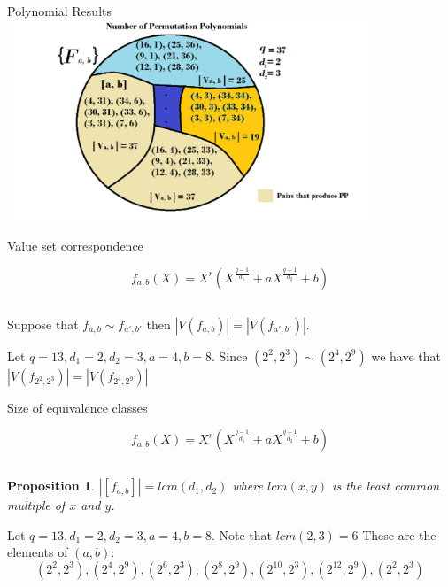 \documentclass{beamer}
\newtheorem{proposition}{Proposition}
\begin{document}
\begin{frame}{Polynomial Results}
  \includegraphics[width=11cm, height=6cm]{clases1}
\end{frame}

\begin{frame}{Value set correspondence}

  {\Large $$f_{a,b}(X) = X^r(X^{\frac{q-1}{d_1}} + aX^{\frac{q-1}{d_2}} +b)$$}

  $$$$

  \begin{theorem}

    Suppose that $f_{a, b} \sim f_{a',b'}$ then $|V(f_{a, b})| = |V(f_{a', b'})|$.

  \end{theorem}

  \begin{example}
    Let $q = 13, d_1 = 2, d_2 = 3, a = 4, b = 8$. Since $(2^2,2^3) \sim (2^4,2^9)$ we have that $|V(f_{2^2, 2^3})| = |V(f_{2^4, 2^9})|$
  \end{example}

\end{frame}

\begin{frame}{Size of equivalence classes}
  
  {\Large $$f_{a,b}(X) = X^r(X^{\frac{q-1}{d_1}} + aX^{\frac{q-1}{d_2}} +b)$$}

  $$$$

  \begin{proposition}
    $|[f_{a, b}]| = lcm(d_1,d_2)$ where $lcm(x,y)$ is the least common multiple of $x$ and $y$.
  \end{proposition}

  \begin{example}
    Let $q = 13, d_1 = 2, d_2 = 3, a = 4, b = 8$. Note that $lcm(2,3) = 6$ These are the elements of $(a,b)$:
    $$ (2^2, 2^3), (2^4, 2^9), (2^6, 2^3), (2^8, 2^9), (2^10, 2^3), (2^{12}, 2^9), (2^2, 2^3) $$
  \end{example}
\end{frame}
\end{document}
